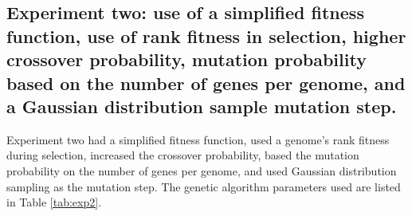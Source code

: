 \subsection[Experiment Two]{Experiment two: use of a simplified fitness function, use of rank fitness in selection, higher crossover probability, mutation probability based on the number of genes per genome, and a Gaussian distribution sample mutation step.}


Experiment two had a simplified fitness function, used a genome's rank fitness during selection, increased the crossover probability, based the mutation probability on the number of genes per genome, and used Gaussian distribution sampling as the mutation step. The genetic algorithm parameters used are listed in Table \ref{tab:exp2}.

\renewcommand{\baselinestretch}{1.0}

